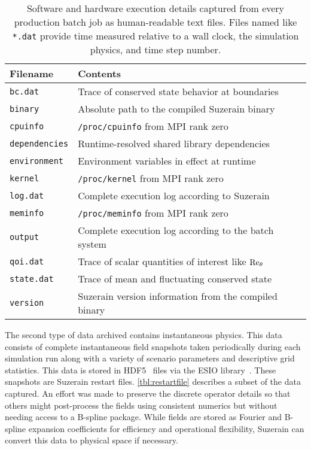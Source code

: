 \begin{table}
\centering
\caption[Execution details captured from each production batch job]{%
  Software and hardware execution details captured from every production batch
  job as human-readable text files.  Files named like \texttt{*.dat} provide time
  measured relative to a wall clock, the simulation physics, and time step
  number.\label{tbl:executiondetails}
}
\begin{small}
\begin{tabular}{p{}|p{}}
Filename & Contents \\ \hline \hline
\texttt{bc.dat}       & Trace of conserved state behavior at boundaries \\
\texttt{binary}       & Absolute path to the compiled Suzerain binary \\
\texttt{cpuinfo}      & \texttt{/proc/cpuinfo} from MPI rank zero \\
\texttt{dependencies} & Runtime-resolved shared library dependencies \\
\texttt{environment}  & Environment variables in effect at runtime \\
\texttt{kernel}       & \texttt{/proc/kernel} from MPI rank zero \\
\texttt{log.dat}      & Complete execution log according to Suzerain \\
\texttt{meminfo}      & \texttt{/proc/meminfo} from MPI rank zero \\
\texttt{output}       & Complete execution log according to the batch system \\
\texttt{qoi.dat}      & Trace of scalar quantities of interest like $\Reynolds[\theta]{}$ \\
\texttt{state.dat}    & Trace of mean and fluctuating conserved state \\
\texttt{version}      & Suzerain version information from the compiled binary
\end{tabular}
\end{small}
\end{table}

The second type of data archived contains instantaneous physics.  This data
consists of complete instantaneous field snapshots taken periodically during each
simulation run along with a variety of scenario parameters and descriptive grid
statistics.  This data is stored in HDF5~\citep{hdf5} files via the ESIO
library~\citep{ESIOweb}.  These snapshots are Suzerain restart
files.  \autoref{tbl:restartfile} describes a subset of the data captured.  An
effort was made to preserve the discrete operator details so that others might
post-process the fields using consistent numerics but without needing access to
a B-spline package.  While fields are stored as Fourier and B-spline
expansion coefficients for efficiency and operational flexibility, Suzerain can convert this data to physical space if
necessary.

